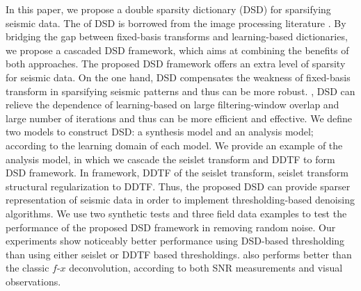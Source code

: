In this paper, we propose a double sparsity dictionary (DSD) for sparsifying seismic data. The  of DSD is borrowed from the image processing literature \cite[]{ron2010,ophir2011}.  By bridging the gap between fixed-basis transforms and learning-based dictionaries, we propose a cascaded DSD framework, which aims at combining the benefits of both approaches. The proposed DSD framework offers an extra level of sparsity for   seismic data. On the one hand, DSD compensates the weakness of fixed-basis transform in sparsifying seismic  patterns and thus can be more robust. , DSD can relieve the dependence of learning-based   on large filtering-window overlap and large number of iterations and thus can be more efficient and effective. We define two models to construct DSD: a synthesis model and an analysis model; according to the learning domain of each model. %
We provide an example of the analysis model, in which we  cascade the seislet transform and DDTF to form   DSD framework. In   framework, DDTF   of the seislet transform,  seislet transform   structural regularization to DDTF. Thus, the proposed DSD can provide sparser representation of seismic data in order to implement thresholding-based denoising algorithms.   We use two synthetic tests and three field data examples to test the performance of the proposed DSD framework in removing random noise. Our experiments show noticeably better performance using DSD-based thresholding than using either seislet or DDTF based thresholdings.  also performs  better than the classic $f$-$x$ deconvolution, according to both SNR measurements and visual observations.



